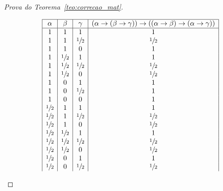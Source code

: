 \begin{proof}[Prova do Teorema~\ref{teo:correcao_mat}]
\begin{provaporcasos}
\begin{provaporsubcasos}
                        \begin{center}
                            \[
                                \begin{array}{|c|c|c|c|}%
                                    \hline%
                                    \alpha      & \beta & \gamma & (\alpha \to (\beta \to \gamma)) \to ((\alpha \to \beta) \to (\alpha \to \gamma)) \\
                                    \hline%
                                    1           & 1           & 1           & 1 \\
                                    1           & 1           & \meio{} & \meio{} \\
                                    1           & 1           & 0           & 1 \\
                                    1           & \meio{} & 1           & 1 \\
                                    1           & \meio{} & \meio{} & \meio{} \\
                                    1           & \meio{} & 0           & \meio{} \\
                                    1           & 0           & 1           & 1 \\
                                    1           & 0           & \meio{} & 1 \\
                                    1           & 0           & 0           & 1 \\
                                    \meio{} & 1           & 1           & 1 \\
                                    \meio{} & 1           & \meio{} & \meio{} \\
                                    \meio{} & 1           & 0           & \meio{} \\
                                    \meio{} & \meio{} & 1           & 1 \\
                                    \meio{} & \meio{} & \meio{} & \meio{} \\
                                    \meio{} & \meio{} & 0           & \meio{} \\
                                    \meio{} & 0           & 1           & 1 \\
                                    \meio{} & 0           & \meio{} & \meio{} \\

\end{array}\]
\end{center}
\end{provaporsubcasos}
\end{provaporcasos}
\end{proof}
